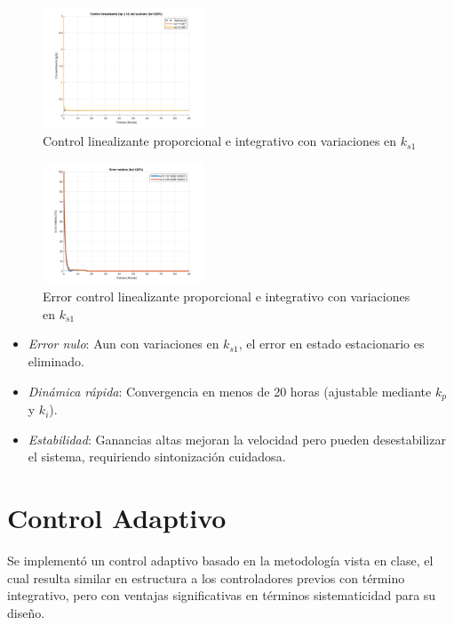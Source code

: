 \documentclass[letterpaper, 10 pt, conference]{ieeeconf}  %
\begin{document}
\begin{figure}[H]
  \centering
  \includegraphics[width=0.43\textwidth]{./Images_tp3/lin_ki.png}
  \caption{Control linealizante proporcional e integrativo con variaciones en $k_{s1}$}
\end{figure}
\begin{figure}[H]
  \centering
  \includegraphics[width=0.43\textwidth]{./Images_tp3/lin_ki_err.png}
  \caption{Error control linealizante proporcional e integrativo con variaciones en $k_{s1}$}
\end{figure}

\begin{itemize}  
    \item \textit{Error nulo}: Aun con variaciones en \(k_{s1}\), el error en estado estacionario es eliminado.  
    \item \textit{Dinámica rápida}: Convergencia en menos de 20 horas (ajustable mediante \(k_p\) y \(k_i\)).  
    \item \textit{Estabilidad}: Ganancias altas mejoran la velocidad pero pueden desestabilizar el sistema, requiriendo sintonización cuidadosa.  
\end{itemize}  

\section{Control Adaptivo}

Se implementó un control adaptivo basado en la metodología vista en clase, el cual resulta similar en estructura a los controladores previos con término integrativo, pero con ventajas significativas en términos sistematicidad para su diseño.
\end{document}
